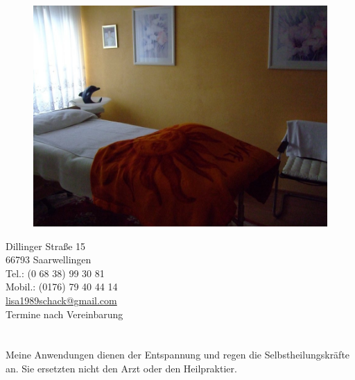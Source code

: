 \documentclass[10pt,foldmark,notumble]{leaflet}
\begin{document}
\begin{figure}[h]
\includegraphics [scale=.25]{Bild1.jpg}
 \end{figure}


\vspace*{7mm}
\begin{center}
Dillinger Straße 15\\
66793 Saarwellingen\\
Tel.: (0 68 38) 99 30 81\\
Mobil.: (0176) 79 40 44 14\\
\href{mailto:lisa1989schack@gmail.com}{lisa1989schack@gmail.com} \\
Termine nach Vereinbarung
\end{center}

\section{ }
Meine Anwendungen dienen der Entspannung und regen die Selbstheilungskräfte an. Sie ersetzten nicht den Arzt oder den Heilpraktier. 
\end{document}
